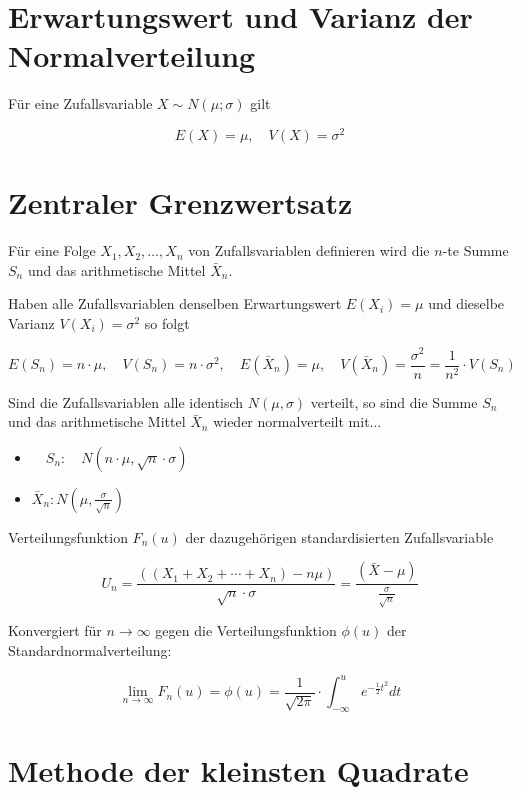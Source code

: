 \documentclass[10pt]{article}
\begin{document}
\section*{Erwartungswert und Varianz der Normalverteilung}
Für eine Zufallsvariable $X \sim N(\mu ; \sigma)$ gilt

$$
E(X)=\mu, \quad V(X)=\sigma^{2}
$$

\section*{Zentraler Grenzwertsatz}
Für eine Folge $X_{1}, X_{2}, \ldots, X_{n}$ von Zufallsvariablen definieren wird die $n$-te Summe $S_{n}$ und das arithmetische Mittel $\bar{X}_{n}$.

Haben alle Zufallsvariablen denselben Erwartungswert $E\left(X_{i}\right)=\mu$ und dieselbe Varianz $V\left(X_{i}\right)=\sigma^{2}$ so folgt

$$
E\left(S_{n}\right)=n \cdot \mu, \quad V\left(S_{n}\right)=n \cdot \sigma^{2}, \quad E\left(\bar{X}_{n}\right)=\mu, \quad V\left(\bar{X}_{n}\right)=\frac{\sigma^{2}}{n}=\frac{1}{n^{2}} \cdot V\left(S_{n}\right)
$$

Sind die Zufallsvariablen alle identisch $N(\mu, \sigma)$ verteilt, so sind die Summe $S_{n}$ und das arithmetische Mittel $\bar{X}_{n}$ wieder normalverteilt mit...

\begin{itemize}
  \item $\quad S_{n}: \quad N(n \cdot \mu, \sqrt{n} \cdot \sigma)$
  \item $\bar{X}_{n}: N\left(\mu, \frac{\sigma}{\sqrt{n}}\right)$
\end{itemize}

Verteilungsfunktion $F_{n}(u)$ der dazugehörigen standardisierten Zufallsvariable

$$
U_{n}=\frac{\left(\left(X_{1}+X_{2}+\cdots+X_{n}\right)-n \mu\right)}{\sqrt{n} \cdot \sigma}=\frac{(\bar{X}-\mu)}{\frac{\sigma}{\sqrt{n}}}
$$

Konvergiert für $n \rightarrow \infty$ gegen die Verteilungsfunktion $\phi(u)$ der Standardnormalverteilung:

$$
\lim _{n \rightarrow \infty} F_{n}(u)=\phi(u)=\frac{1}{\sqrt{2 \pi}} \cdot \int_{-\infty}^{u} e^{-\frac{1}{2} t^{2}} d t
$$

\section*{Methode der kleinsten Quadrate}
\end{document}
